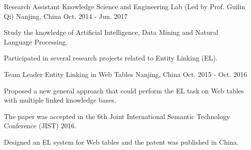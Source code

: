 

\begin{cventries}

  \cventry
    {Research Assistant} %
    {Knowledge Science and Engineering Lab (Led by Prof. Guilin Qi)} %
    {Nanjing, China} %
    {Oct. 2014 - Jun. 2017} %
    {
      \begin{cvitems} %
        \item {Study the knowledge of Artificial Intelligence, Data Mining and Natural Language Processing.}
        \item {Participated in several research projects related to Entity Linking (EL).}
      \end{cvitems}
    }

  \cventry
    {Team Leader} %
    {Entity Linking in Web Tables} %
    {Nanjing, China} %
    {Oct. 2015 - Oct. 2016} %
    {
      \begin{cvitems} %
        \item {Proposed a new general approach that could perform the EL task on Web tables with multiple linked knowledge bases.}
        \item {The paper was accepted in the 6th Joint International Semantic Technology Conference (JIST) 2016.}
        \item {Designed an EL system for Web tables and the patent was published in China.}
      \end{cvitems}
    }


\end{cventries}
